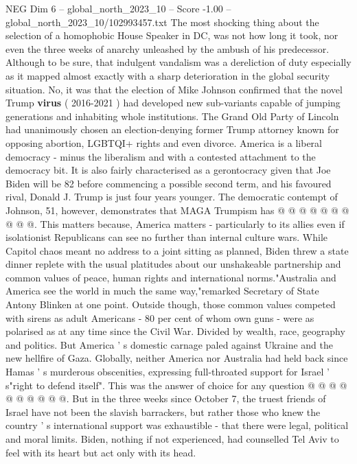 \begin{textsample}{NEG Dim 6 – global\_north\_2023\_10 – Score -1.00 – global\_north\_2023\_10/102993457.txt}  \label{ex:f6_neg_248}
The most shocking thing about the selection of a homophobic House Speaker in DC, was not how long it took, nor even the three weeks of anarchy unleashed by the ambush of his predecessor.
Although to be sure, that indulgent vandalism was a dereliction of duty especially as it mapped almost exactly with a sharp deterioration in the global security situation.
No, it was that the election of Mike Johnson confirmed that the novel Trump \textbf{virus} ( 2016-2021 ) had developed new sub-variants capable of jumping generations and inhabiting whole institutions.
The Grand Old Party of Lincoln had unanimously chosen an election-denying former Trump attorney known for opposing abortion, LGBTQI+ rights and even divorce.
America is a liberal democracy - minus the liberalism and with a contested attachment to the democracy bit.
It is also fairly characterised as a gerontocracy given that Joe Biden will be 82 before commencing a possible second term, and his favoured rival, Donald J.
Trump is just four years younger.
The democratic contempt of Johnson, 51, however, demonstrates that MAGA Trumpism has @ @ @ @ @ @ @ @ @ @.
This matters because, America matters - particularly to its allies even if isolationist Republicans can see no further than internal culture wars.
While Capitol chaos meant no address to a joint sitting as planned, Biden threw a state dinner replete with the usual platitudes about our unshakeable partnership and common values of peace, human rights and international norms."Australia and America see the world in much the same way,"remarked Secretary of State Antony Blinken at one point.
Outside though, those common values competed with sirens as adult Americans - 80 per cent of whom own guns - were as polarised as at any time since the Civil War.
Divided by wealth, race, geography and politics.
But America ' s domestic carnage paled against Ukraine and the new hellfire of Gaza.
Globally, neither America nor Australia had held back since Hamas ' s murderous obscenities, expressing full-throated support for Israel ' s"right to defend itself".
This was the answer of choice for any question @ @ @ @ @ @ @ @ @ @.
But in the three weeks since October 7, the truest friends of Israel have not been the slavish barrackers, but rather those who knew the country ' s international support was exhaustible - that there were legal, political and moral limits.
Biden, nothing if not experienced, had counselled Tel Aviv to feel with its heart but act only with its head.

\end{textsample}
